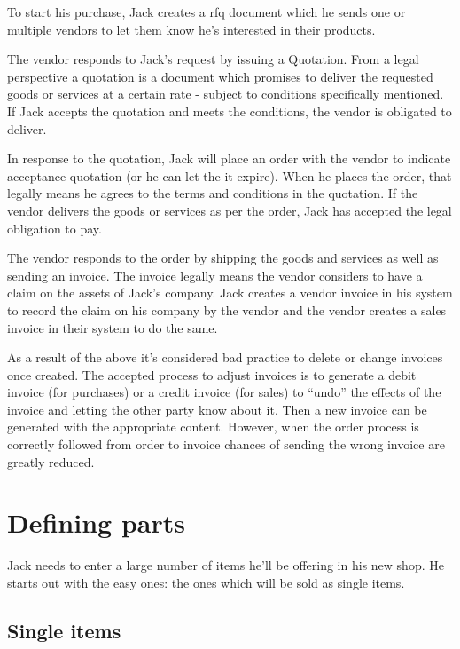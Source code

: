 To start his purchase, Jack creates a \gls{rfq} document which
he sends one or multiple vendors to let them know he's interested in their products.

The vendor responds to Jack's request by issuing a Quotation. From a legal perspective
a quotation is a document which promises to deliver the requested goods or services at a
certain rate - subject to conditions specifically mentioned. If Jack accepts the quotation
and meets the conditions, the vendor is obligated to deliver.

In response to the quotation, Jack will place an order with the vendor to indicate
acceptance quotation (or he can let the
it expire). When he places the order, that legally means he agrees to the terms
and conditions in the quotation. If the vendor delivers the goods or services as per the
order, Jack has accepted the legal obligation to pay.

The vendor responds to the order by shipping the goods and services as well
as sending an invoice. The invoice legally means the vendor considers to have a claim on the assets
of Jack's company. Jack creates a vendor invoice in his system to record the claim on his
company by the vendor and the vendor creates a sales invoice in their system to do the same.

As a result of the above it's considered bad practice to delete or change invoices once
created. The accepted process to adjust invoices is to generate a debit invoice (for purchases)
or a credit invoice (for sales) to ``undo'' the effects of the invoice and letting the other party
know about it. Then a new invoice can be generated with the appropriate content. However,
when the order process is correctly followed from order to invoice chances of sending the wrong
invoice are greatly reduced.

\section{Defining parts}
\label{sec-stock-parts}

Jack needs to enter a large number of items he'll be offering in his new shop. He starts out
with the easy ones: the ones which will be sold as single items.

\subsection{Single items}
\label{subsec-stock-parts-single-item}


